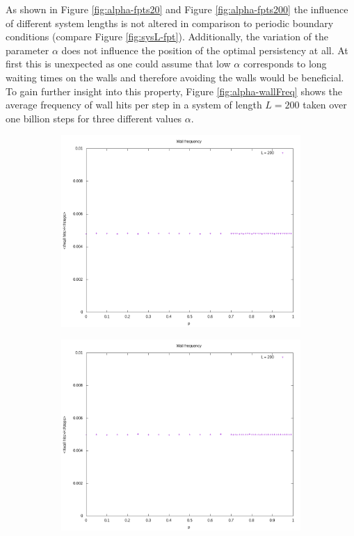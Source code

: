 \documentclass[]{scrartcl}
\begin{document}
As shown in Figure \ref{fig:alpha-fpts20} and Figure \ref{fig:alpha-fpts200} the influence of different system lengths is not altered in comparison to periodic boundary conditions (compare Figure \ref{fig:sysL-fpt}). Additionally, the variation of the parameter $\alpha$ does not influence the position of the optimal persistency at all. At first this is unexpected as one could assume that low $\alpha$ corresponds to long waiting times on the walls and therefore avoiding the walls would be beneficial. To gain further insight into this property, Figure \ref{fig:alpha-wallFreq} shows the average frequency of wall hits per step in a system of length $L = 200$ taken over one billion steps for three different values $\alpha$.

 \begin{figure}[!hbt]
\centering
\begin{subfigure}{0.45\textwidth}
 \includegraphics[width=\textwidth]{./fig/alpha/wallFreq/WF-alpha=01-rel.png}
\end{subfigure}
\begin{subfigure}{0.45\textwidth}
 \includegraphics[width=\textwidth]{./fig/alpha/wallFreq/WF-alpha=05-rel.png}

\end{subfigure}
\end{figure}
\end{document}
